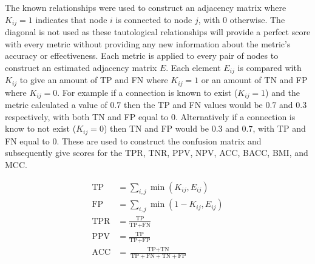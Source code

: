 \documentclass[runningheads]{llncs}
\begin{document}
The known relationships were used to construct an adjacency matrix where
$K_{ij} = 1$ indicates that node $i$ is connected to node $j$, with $0$
otherwise.
The diagonal is not used as these tautological relationships will provide a
perfect score with every metric without providing any new information about the
metric's accuracy or effectiveness.
Each metric is applied to every pair of nodes to construct an estimated
adjacency matrix $E$.
Each element $E_{ij}$ is compared with $K_{ij}$ to give an amount of
\gls{TP} and \gls{FN} where $K_{ij} = 1$ or an amount of
\gls{TN} and \gls{FP} where $K_{ij} = 0$.
For example if a connection is known to exist ($K_{ij} = 1$) and the metric
calculated a value of $0.7$ then the \acrlong{TP} and \acrlong{FN} values
would be $0.7$ and $0.3$ respectively, with both \acrlong{TN} and
\acrlong{FP} equal to $0$.
Alternatively if a connection is know to not exist ($K_{ij} = 0$) then
\acrlong{TN} and \acrlong{FP} would be $0.3$ and $0.7$, with \acrlong{TP}
and \acrlong{FN} equal to $0$.
These are used to construct the confusion matrix and subsequently give scores
for the \gls{TPR}, \gls{TNR}, \gls{PPV}, \gls{NPV}, \gls{ACC}, \gls{BACC},
\gls{BMI}, and \gls{MCC}.
\begin{minipage}[t]{0.50\textwidth}
\begin{align*}
\text{TP} &= \sum_{i,j} {\min}{\left( K_{ij}, E_{ij} \right)} \\
\text{FP} &= \sum_{i,j} {\min}{\left( 1-K_{ij}, E_{ij} \right)} \\
\text{TPR} &= \frac{\text{TP}} {\text{TP} + \text{FN}} \\
\text{PPV} &= \frac{\text{TP}} {\text{TP} + \text{FP}} \\
\text{ACC} &= \frac{\text{TP} + \text{TN}}
                   {\text{TP} + \text{FN} + \text{TN} + \text{FP}} %
\end{align*}
\end{minipage}%
%
\end{document}
